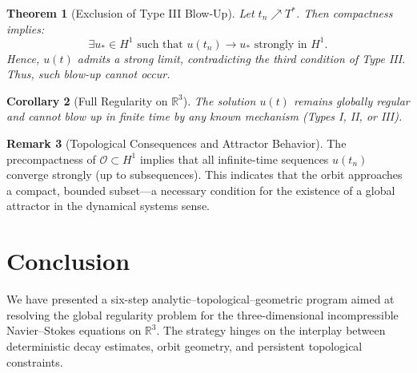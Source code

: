 \documentclass[11pt]{article}
\newtheorem{theorem}{Theorem}[section]
\newtheorem{corollary}[theorem]{Corollary}
\theoremstyle{definition}
\newtheorem{remark}[theorem]{Remark}
\begin{document}
\begin{theorem}[Exclusion of Type III Blow-Up]
Let \( t_n \nearrow T^* \). Then compactness implies:
\[
\exists u_* \in H^1 \text{ such that } u(t_n) \to u_* \text{ strongly in } H^1.
\]
Hence, \( u(t) \) admits a strong limit, contradicting the third condition of Type III. Thus, such blow-up cannot occur.
\end{theorem}

\begin{corollary}[Full Regularity on \( \mathbb{R}^3 \)]
The solution $u(t)$ remains globally regular and cannot blow up in finite time by any known mechanism (Types I, II, or III).
\end{corollary}

\begin{remark}[Topological Consequences and Attractor Behavior]
The precompactness of \( \mathcal{O} \subset H^1 \) implies that all infinite-time sequences \( u(t_n) \) converge strongly (up to subsequences). This indicates that the orbit approaches a compact, bounded subset—a necessary condition for the existence of a global attractor in the dynamical systems sense.
\end{remark}


\section{Conclusion}
\label{sec:conclusion}

We have presented a six-step analytic–topological–geometric program aimed at resolving the global regularity problem for the three-dimensional incompressible Navier–Stokes equations on \( \mathbb{R}^3 \). The strategy hinges on the interplay between deterministic decay estimates, orbit geometry, and persistent topological constraints.
\end{document}
